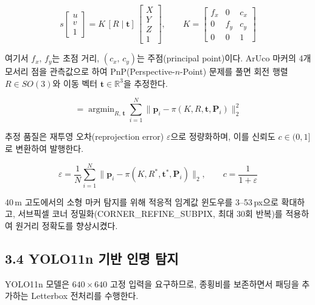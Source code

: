 \documentclass[11pt,a4paper]{article}
\begin{document}
\begin{equation}
  s\begin{bmatrix}u\\v\\1\end{bmatrix}
  = K\,[R\mid\mathbf{t}]\,
    \begin{bmatrix}X\\Y\\Z\\1\end{bmatrix},
  \qquad
  K = \begin{bmatrix}f_x & 0 & c_x \\ 0 & f_y & c_y \\ 0 & 0 & 1\end{bmatrix}
  \label{eq:proj}
\end{equation}

여기서 $f_x,\,f_y$는 초점 거리, $(c_x,\,c_y)$는 주점(principal point)이다.
ArUco 마커의 4개 모서리 점을 관측값으로 하여 PnP(Perspective-$n$-Point) 문제를
풀면 회전 행렬 $R\in SO(3)$와 이동 벡터 $\mathbf{t}\in\mathbb{R}^3$을 추정한다.

\begin{equation}
  [R^*,\,\mathbf{t}^*]
  = \mathop{\arg\min}_{R,\,\mathbf{t}}
    \sum_{i=1}^{N}
    \bigl\|\mathbf{p}_i - \pi(K,R,\mathbf{t},\mathbf{P}_i)\bigr\|_2^2
  \label{eq:pnp}
\end{equation}

추정 품질은 재투영 오차(reprojection error) $\varepsilon$으로 정량화하며,
이를 신뢰도 $c \in (0,1]$로 변환하여 발행한다.

\begin{equation}
  \varepsilon
  = \frac{1}{N}\sum_{i=1}^{N}
    \bigl\|\mathbf{p}_i - \pi(K,R^*,\mathbf{t}^*,\mathbf{P}_i)\bigr\|_2,
  \qquad
  c = \frac{1}{1+\varepsilon}
  \label{eq:reproj}
\end{equation}

40\,m 고도에서의 소형 마커 탐지를 위해 적응적 임계값 윈도우를 3--53\,px으로
확대하고, 서브픽셀 코너 정밀화(CORNER\_REFINE\_SUBPIX, 최대 30회 반복)를
적용하여 원거리 정확도를 향상시켰다.

\subsection*{3.4 YOLO11n 기반 인명 탐지}

YOLO11n 모델은 $640\times640$ 고정 입력을 요구하므로, 종횡비를 보존하면서
패딩을 추가하는 Letterbox 전처리를 수행한다.
\end{document}
